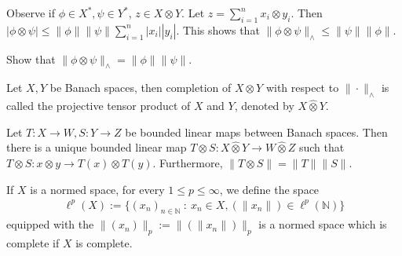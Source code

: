 

Observe if $\phi \in X^*, \psi \in Y^*$, $z \in X \otimes Y$. Let $z
= \sum_{i = 1}^{n} x_i \otimes y_i$. Then $|\phi \otimes \psi| \le
\|\phi\| \|\psi\| \sum_{i = 1}^{n} |x_i| |y_i|$. This shows that
$\|\phi \otimes \psi\|_{\wedge} \le \|\psi\| \|\phi\|$.
\begin{exercise}
  Show that $\|\phi \otimes \psi\|_{\wedge} = \|\phi\| \|\psi\|$.
\end{exercise}

\begin{definition}
  Let $X, Y$ be Banach spaces, then completion of $X \otimes Y$ with
  respect to $ \|\cdot\|_{\wedge}$ is called the projective tensor
  product of $X$ and $Y$, denoted by $X \hat{\otimes} Y$.
\end{definition}

\begin{proposition}
  Let $T: X \to W, S: Y \to Z$ be bounded linear maps between Banach
  spaces. Then there is a unique bounded linear map $T \otimes S: X
  \hat{\otimes} Y \to W \hat{\otimes} Z$ such that $T \otimes S: x
  \otimes y \to T(x)\otimes T(y)$. Furthermore, $\|T \otimes
  S\| = \|T\| \|S\|$.
\end{proposition}

\begin{definition}
  If $X$ is a normed space, for every $1 \le p \le \infty$, we define the space
  \begin{align*}
    \ell^{p}(X) := \{ (x_n)_{n \in \mathbb{N}}  \ : \ x_n \in X,
    (\|x_n\|) \in \ell^{p}(\mathbb{N})  \}
  \end{align*}
  equipped with the $\|(x_n)\|_p := \|(\|x_n\|)\|_p$ is a normed
  space which is complete if $X$ is complete.
\end{definition}

